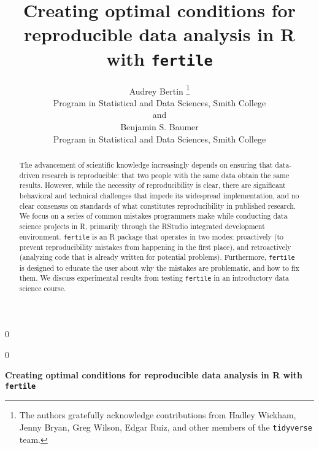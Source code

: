 \documentclass[12pt]{article}
\newcommand{\blind}{0}
\begin{document}
\def\spacingset#1{\renewcommand{\baselinestretch}%
{#1}\small\normalsize} \spacingset{1}



\blind
{
  \title{\bf Creating optimal conditions for reproducible data analysis in R with
\texttt{fertile}}

  \author{
        Audrey Bertin \thanks{The authors gratefully acknowledge contributions from Hadley Wickham,
Jenny Bryan, Greg Wilson, Edgar Ruiz, and other members of the
\texttt{tidyverse} team.} \\
    Program in Statistical and Data Sciences, Smith College\\
     and \\     Benjamin S. Baumer \\
    Program in Statistical and Data Sciences, Smith College\\
      }
  \maketitle
} \fi

\blind
{
  \bigskip
  \bigskip
  \bigskip
  \begin{center}
    {\LARGE\bf Creating optimal conditions for reproducible data analysis in R with
\texttt{fertile}}
  \end{center}
  \medskip
} \fi

\bigskip
\begin{abstract}
The advancement of scientific knowledge increasingly depends on ensuring
that data-driven research is reproducible: that two people with the same
data obtain the same results. However, while the necessity of
reproducibility is clear, there are significant behavioral and technical
challenges that impede its widespread implementation, and no clear
consensus on standards of what constitutes reproducibility in published
research. We focus on a series of common mistakes programmers make while
conducting data science projects in R, primarily through the RStudio
integrated development environment. \texttt{fertile} is an R package
that operates in two modes: proactively (to prevent reproducibility
mistakes from happening in the first place), and retroactively
(analyzing code that is already written for potential problems).
Furthermore, \texttt{fertile} is designed to educate the user about why
the mistakes are problematic, and how to fix them. We discuss
experimental results from testing \texttt{fertile} in an introductory
data science course.
\end{abstract}
\end{document}

